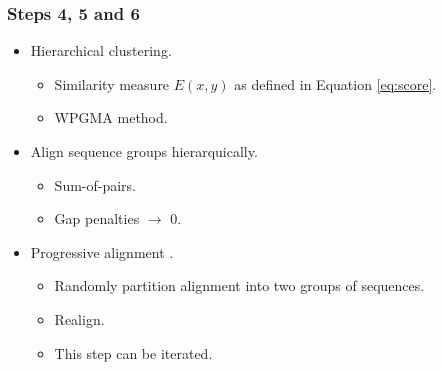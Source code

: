 \begin{frame}
    \frametitle{Steps 4, 5 and 6}
    \begin{itemize}
        \item Hierarchical clustering.
        \begin{itemize}
          \item Similarity measure $E(x,y)$ as defined in Equation \eqref{eq:score}.
          \item WPGMA method.
        \end{itemize}
        \item Align sequence groups hierarquically.
        \begin{itemize}
            \item Sum-of-pairs.
            \item Gap penalties $\rightarrow$ $0$.
        \end{itemize}
        \item Progressive alignment \cite{wallace2005multiple}.
        \begin{itemize}
            \item Randomly partition alignment into two groups of sequences.
            \item Realign.
            \item This step can be iterated.
        \end{itemize}
    \end{itemize}
    
\end{frame}